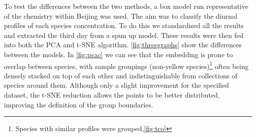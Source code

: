 To test the differences between the two methods, a box model run representative of the chemistry within Beijing was used. The aim was to classify the diurnal profiles of each species concentration. To do this we standardised all the results and extracted the third day from a spun up model. These results were then fed into both the PCA and t-SNE algorithm. \autoref{fig:threegraphs} show the differences between the models. In \autoref{fig:pcac} we can see that the embedding is prone to overlap between species, with sample groupings (non-yellow species)\footnote{Species with similar profiles were grouped,\autoref{fig:tco} } often being densely stacked on top of each other and indistinguishable from collections of species around them. Although only a slight improvement for the specified dataset, the t-SNE reduction allows the points to be better distributed, improving the definition of the group boundaries.

